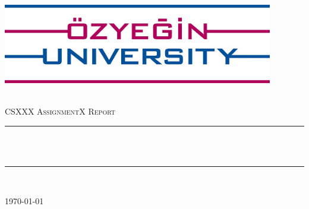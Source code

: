\begin{titlepage}
\centering
\includegraphics[height=3.5cm]{images/ozu.jpg}\\[1cm]   
\begin{center}

~\\[1.5cm]

\textsc{\Large CSXXX Assignment\-X Report}\\[0.5cm]

\hrule ~\\[0.2cm]
{\huge \bfseries \mytitle}\\[0.4cm]		%
\hrule ~\\[1.5cm]

\begin{minipage}{0.4\textwidth}
    \centering
	\large
		\myauthor
\end{minipage}

\vfill

{\large \today}

\end{center}
\end{titlepage}
